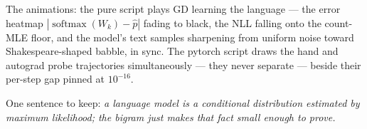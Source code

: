 \documentclass[11pt]{article}
\newcommand{\smax}{\operatorname{softmax}}
\begin{document}
The animations: the pure script plays GD learning the language ---
the error heatmap $|\smax(W_k) - \hat p|$ fading to black, the NLL
falling onto the count-MLE floor, and the model's text samples
sharpening from uniform noise toward Shakespeare-shaped babble, in
sync. The pytorch script draws the hand and autograd probe trajectories
simultaneously --- they never separate --- beside their per-step gap
pinned at $10^{-16}$.

One sentence to keep: \emph{a language model is a conditional
distribution estimated by maximum likelihood; the bigram just makes
that fact small enough to prove.}
\end{document}
